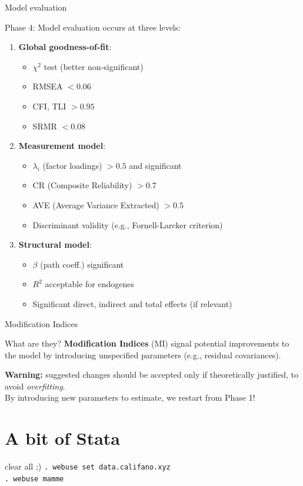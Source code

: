 \documentclass{beamer}
\begin{document}
\begin{frame}{Model evaluation}
    \begin{block}{Phase 4:}
        Model evaluation occurs at three levels:
        \begin{enumerate}
            \item \textbf{Global goodness-of-fit}:
            \begin{itemize}
                \item $\chi^2$ test (better non-significant)
                \item RMSEA $< 0.06$
                \item CFI, TLI $> 0.95$
                \item SRMR $< 0.08$
            \end{itemize}
            \item \textbf{Measurement model}:
            \begin{itemize}
                \item $\lambda_i$ (factor loadings) $> 0.5$ and significant
                \item CR (Composite Reliability) $> 0.7$
                \item AVE (Average Variance Extracted) $> 0.5$
                \item Discriminant validity (e.g., Fornell-Larcker criterion)
            \end{itemize}
            \item \textbf{Structural model}:
            \begin{itemize}
                \item $\beta$ (path coeff.) significant
                \item $R^2$ acceptable for endogenes
                \item Significant direct, indirect and total effects (if relevant)
            \end{itemize}
        \end{enumerate}
    \end{block}
\end{frame}

\begin{frame}{Modification Indices}
    \begin{block}{What are they?}
        \textbf{Modification Indices} (MI) signal potential improvements to the model by introducing unspecified parameters (e.g., residual covariances).
    \end{block}
    \vspace{1em}
    \textbf{Warning:} suggested changes should be accepted only if theoretically justified, to avoid \textit{overfitting}.\\
    \vspace{1em}
    By introducing new parameters to estimate, we restart from Phase 1!
\end{frame}

\section{A bit of Stata}
\begin{frame}{clear all ;)}
    \texttt{. webuse set data.califano.xyz} \\
    \texttt{. webuse mamme}
\end{frame}
\end{document}
